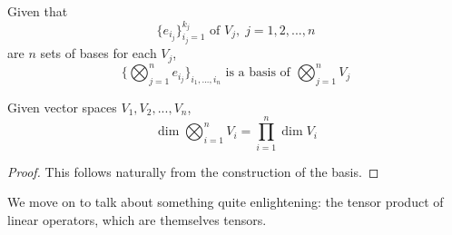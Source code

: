   \begin{definition}
  Given that 
  \[ \{ e_{i_{j}}\}_{i_{j}=1}^{k_{j}} \text{ of } V_{j},\; j = 1, 2, ..., n\]
  are $n$ sets of bases for each $V_{j}$, 
  \[ \{ \bigotimes_{j=1}^{n} e_{i_{j}} \}_{i_{1}, ..., i_{n}} \text{ is a basis of } \bigotimes_{j=1}^{n} V_{j}\]
  \end{definition}

  \begin{proposition}
  Given vector spaces $V_1, V_2, ..., V_n$, 
  \[ \dim \bigotimes_{i=1}^{n} V_i = \prod_{i=1}^{n} \dim V_{i}\]
  \end{proposition}
  \begin{proof}
  This follows naturally from the construction of the basis.
  \end{proof}

  We move on to talk about something quite enlightening: the tensor product of linear operators, which are themselves tensors. 

